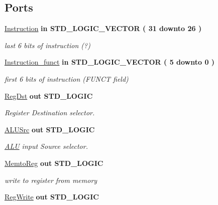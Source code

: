 \subsection*{\-Ports}
 \begin{DoxyCompactItemize}
\item 
\hyperlink{class_control_a35120c002e477a6e77c738ea1aaa5505}{\-Instruction}  {\bfseries {\bfseries in }} {\bfseries \-S\-T\-D\-\_\-\-L\-O\-G\-I\-C\-\_\-\-V\-E\-C\-T\-O\-R (   31    downto    26  ) } 
\begin{DoxyCompactList}\small\item\em last 6 bits of instruction (?) \end{DoxyCompactList}\item 
\hyperlink{class_control_a837426aa7a23a4b3f1534d7a5a47fd84}{\-Instruction\-\_\-funct}  {\bfseries {\bfseries in }} {\bfseries \-S\-T\-D\-\_\-\-L\-O\-G\-I\-C\-\_\-\-V\-E\-C\-T\-O\-R (   5    downto    0  ) } 
\begin{DoxyCompactList}\small\item\em first 6 bits of instruction (\-F\-U\-N\-C\-T field) \end{DoxyCompactList}\item 
\hyperlink{class_control_a3e8450f5ca7972a364f6eaffec9c86a2}{\-Reg\-Dst}  {\bfseries {\bfseries out }} {\bfseries \-S\-T\-D\-\_\-\-L\-O\-G\-I\-C } 
\begin{DoxyCompactList}\small\item\em \-Register \-Destination selector. \end{DoxyCompactList}\item 
\hyperlink{class_control_aec5087b6dc490446af52e39d0264cf50}{\-A\-L\-U\-Src}  {\bfseries {\bfseries out }} {\bfseries \-S\-T\-D\-\_\-\-L\-O\-G\-I\-C } 
\begin{DoxyCompactList}\small\item\em \hyperlink{class_a_l_u}{\-A\-L\-U} input \-Source selector. \end{DoxyCompactList}\item 
\hyperlink{class_control_ae18caf473070cf8e735d12ca860fb762}{\-Memto\-Reg}  {\bfseries {\bfseries out }} {\bfseries \-S\-T\-D\-\_\-\-L\-O\-G\-I\-C } 
\begin{DoxyCompactList}\small\item\em write to register from memory \end{DoxyCompactList}\item 
\hyperlink{class_control_a3862189e11b01293ae0279072adc6151}{\-Reg\-Write}  {\bfseries {\bfseries out }} {\bfseries \-S\-T\-D\-\_\-\-L\-O\-G\-I\-C } 

\end{DoxyCompactItemize}
